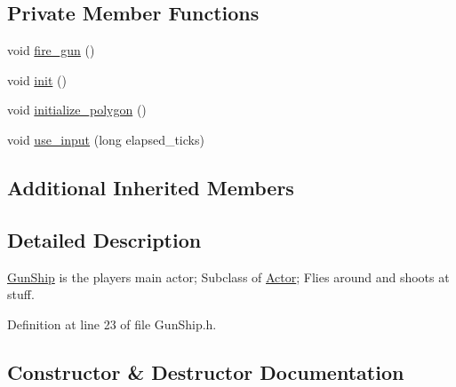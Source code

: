 \subsection*{Private Member Functions}
\begin{DoxyCompactItemize}
\item 
void \hyperlink{classAsteroids_1_1Domain_1_1Game_1_1Actors_1_1GunShip_a9ab9a00f7d3c5f241b8a2a36c146864f}{fire\+\_\+gun} ()
\item 
void \hyperlink{classAsteroids_1_1Domain_1_1Game_1_1Actors_1_1GunShip_ad5c14269f0503e045f03f265f9019e95}{init} ()
\item 
void \hyperlink{classAsteroids_1_1Domain_1_1Game_1_1Actors_1_1GunShip_a4947769593f504d4342abcec5a01330b}{initialize\+\_\+polygon} ()
\item 
void \hyperlink{classAsteroids_1_1Domain_1_1Game_1_1Actors_1_1GunShip_aae99fa7e1cae7f17c81b68217ed2fa32}{use\+\_\+input} (long elapsed\+\_\+ticks)
\end{DoxyCompactItemize}
\subsection*{Additional Inherited Members}


\subsection{Detailed Description}
\hyperlink{classAsteroids_1_1Domain_1_1Game_1_1Actors_1_1GunShip}{Gun\+Ship} is the player\textquotesingle{}s main actor; Subclass of \hyperlink{classAsteroids_1_1Domain_1_1Game_1_1Actors_1_1Actor}{Actor}; Flies around and shoots at stuff. 

Definition at line 23 of file Gun\+Ship.\+h.



\subsection{Constructor \& Destructor Documentation}
\mbox{\label{classAsteroids_1_1Domain_1_1Game_1_1Actors_1_1GunShip_a4e6a5de697b5a88bf3942165397cd27b}} 
